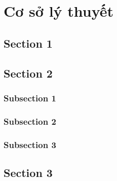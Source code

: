 \chapter{Cơ sở lý thuyết}

\section{Section 1}


\section{Section 2}


\subsection{Subsection 1}



\subsection{Subsection 2}


\subsection{Subsection 3}



\section{Section 3}

